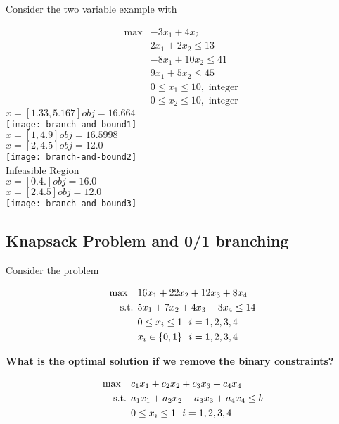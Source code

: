 \documentclass[../open-optimization/open-optimization.tex]{subfiles}
\begin{document}
\begin{example}{}{}
Consider the two variable example with
 
 \begin{align*}
 \max & -3x_1 + 4x_2\\
 & 2x_1 + 2 x_2 \leq 13\\
 & -8 x_1 + 10x_2 \leq 41\\
 & 9x_1 + 5x_2 \leq 45\\
 & 0 \leq x_1 \leq 10, \text{ integer }\\
 & 0 \leq x_2 \leq 10, \text{ integer }
 \end{align*}
$x =  [1.33, 5.167]  obj =  16.664$\\
\noindent \texttt{[image: branch-and-bound1]}\\
$x =  [1,  4.9]  obj =  16.5998$\\
$x =  [2,  4.5]  obj =  12.0$\\
\texttt{[image: branch-and-bound2]}\\
Infeasible Region\\
$x =  [0. 4.]  obj =  16.0$\\
$x =  [2.  4.5]  obj =  12.0$\\
\texttt{[image: branch-and-bound3]}\\

\end{example}



\subsection{Knapsack Problem  and 0/1 branching}

Consider the problem 

\begin{align*}
\max \quad & 16x_1 + 22x_2 + 12x_3 + 8 x_4\\
\text{ s.t. } & 5x_1 + 7x_2 + 4x_3 + 3x_4 \leq 14\\
& 0 \leq x_i \leq 1 \ \ i=1,2,3,4\\
& x_i \in \{0,1\} \ \ i=1,2,3,4
\end{align*}

\textbf{What is the optimal solution if we remove the binary constraints?}

\newpage



\begin{align*}
\max \quad & c_1 x_1 + c_2 x_2 + c_3 x_3 + c_4 x_4\\
\text{ s.t. } & a_1 x_1 + a_2 x_2 + a_3 x_3 + a_4 x_4 \leq b\\
& 0 \leq x_i \leq 1 \ \ i=1,2,3,4\\
\end{align*}
\end{document}
